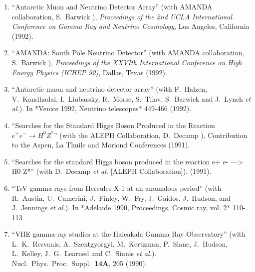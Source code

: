 \begin{enumerate}
\item ``Antarctic Muon and Neutrino Detector Array'' (with
        AMANDA   collaboration, S.~Barwick \etal), {\it
        Proceedings of the 2nd UCLA     International
        Conference on Gamma Ray and Neutrino Cosmology}, Los
        Angeles, California (1992).

\item ``AMANDA: South Pole Neutrino Detector'' (with AMANDA
        collaboration,   S.~Barwick \etal), {\it Proceedings
        of the XXVIth International     Conference on High
        Energy Physics (ICHEP 92)}, Dallas, Texas   (1992).

\item ``Antarctic muon and neutrino detector array'' (with
        F.~Halzen, V.~Kandhadai, I.~Liubarsky, R.~Morse,
        S.~Tilav, S.~Barwick and J.~Lynch {\it et al.}). In
        *Venice 1992, Neutrino telescopes* 449-466 %
        (1992).

\item ``Searches for the Standard Higgs Boson Produced in
        the Reaction   ${e^+}{e^-} \rightarrow H^0 Z^*$''
        (with the ALEPH Collaboration,   D.~Decamp \etal),
        Contribution to the Aspen, La Thuile and Moriond
        Conferences (1991).

\item ``Searches for the standard Higgs boson produced in
        the reaction e+ e- ---> H0 Z*'' (with D.~Decamp {\it
        et al.}  [ALEPH Collaboration]). %
        (1991).

\item ``TeV gamma-rays from Hercules X-1 at an anomalous
        period'' (with R.~Austin, U.~Camerini, J.~Finley,
        W.~Fry, J.~Gaidos, J.~Hudson, and J.~Jennings {\it
        et al.}). In *Adelaide 1990, Proceedings, Cosmic
        ray, vol. 2* 110-113 %

\item ``VHE gamma-ray studies at the Haleakala Gamma Ray
        Observatory'' (with L.~K.~Resvanis, A.~Szentgyorgyi,
        M.~Kertzman, P.~Slane, J.~Hudson, L.~Kelley,
        J.~G.~Learned and C.~Sinnis {\it et al.}). Nucl.\
        Phys.\ Proc.\ Suppl.\  {\bf 14A}, 205 (1990).



\end{enumerate}



